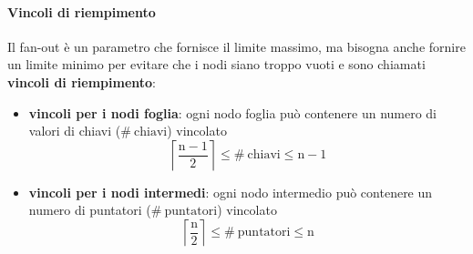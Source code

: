 \paragraph{Vincoli di riempimento}
Il fan-out è un parametro che fornisce il limite massimo, ma bisogna anche fornire un limite minimo per evitare che i nodi siano troppo vuoti e sono chiamati \textbf{vincoli di riempimento}:
\begin{itemize}[label=$\diamond$, itemsep=\medskipamount]
  \item \textbf{vincoli per i nodi foglia}: ogni nodo foglia può contenere un numero di valori di chiavi ($\mathrm{\# \ chiavi}$) vincolato
  \begin{equation*}
    \mathrm{\left\lceil \frac{n - 1}{2} \right\rceil \leq \# \ chiavi \leq n - 1}
  \end{equation*}
  \item \textbf{vincoli per i nodi intermedi}: ogni nodo intermedio può contenere un numero di puntatori ($\mathrm{\# \ puntatori}$) vincolato
  \begin{equation*}
    \mathrm{\left\lceil \frac{n}{2} \right\rceil \leq \# \ puntatori \leq n}
  \end{equation*}
\end{itemize}

